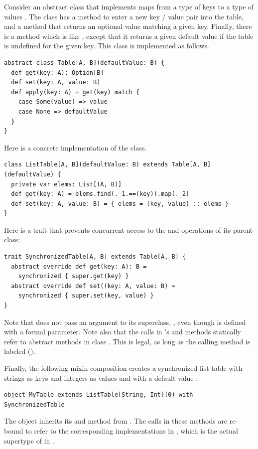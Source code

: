 \example Consider an abstract class  that implements maps
from a type of keys  to a type of values . The class
has a method  to enter a new key / value pair into the table,
and a method  that returns an optional value matching a
given key. Finally, there is a method  which is like
, except that it returns a given default value if the table
is undefined for the given key. This class is implemented as follows.
\begin{lstlisting}
abstract class Table[A, B](defaultValue: B) {
  def get(key: A): Option[B]
  def set(key: A, value: B)
  def apply(key: A) = get(key) match {
    case Some(value) => value
    case None => defaultValue
  }
}
\end{lstlisting}
Here is a concrete implementation of the  class.
\begin{lstlisting}
class ListTable[A, B](defaultValue: B) extends Table[A, B](defaultValue) {
  private var elems: List[(A, B)]
  def get(key: A) = elems.find(._1.==(key)).map(._2)
  def set(key: A, value: B) = { elems = (key, value) :: elems }
}
\end{lstlisting}
Here is a trait that prevents concurrent access to the
 and  operations of its parent class:
\begin{lstlisting}
trait SynchronizedTable[A, B] extends Table[A, B] {
  abstract override def get(key: A): B = 
    synchronized { super.get(key) }
  abstract override def set((key: A, value: B) = 
    synchronized { super.set(key, value) }
}

\end{lstlisting}
Note that  does not pass an argument to
its superclass, , even  though  is defined with a
formal parameter. Note also that the  calls
in 's  and  methods
statically refer to abstract methods in class . This is
legal, as long as the calling method is labeled 
 ().

Finally, the following mixin composition creates a synchronized list table
with strings as keys and integers as values and with a default value :
\begin{lstlisting}
object MyTable extends ListTable[String, Int](0) with SynchronizedTable
\end{lstlisting}
The object  inherits its  and 
method from .  The  calls in these
methods are re-bound to refer to the corresponding implementations in
, which is the actual supertype of  
in . 

